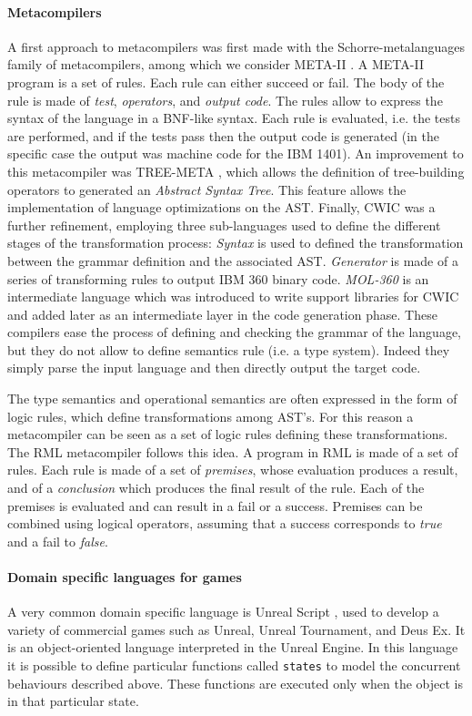 \paragraph{Metacompilers}
A first approach to metacompilers was first made with the
Schorre-metalanguages family of metacompilers, among which we consider
META-II \cite{META2}. A META-II program is a set of rules. Each rule
can either succeed or fail. The body of the rule is made of
\textit{test}, \textit{operators}, and \textit{output code}. The rules
allow to express the syntax of the language in a BNF-like syntax. Each
rule is evaluated, i.e. the tests are performed, and if the tests pass
then the output code is generated (in the specific case the output was
machine code for the IBM 1401). An improvement to this metacompiler
was TREE-META \cite{META3}, which allows the definition of
tree-building operators to generated an \textit{Abstract Syntax Tree}.
This feature allows the implementation of language optimizations on
the AST. Finally, CWIC \cite{CWIC} was a further refinement, employing
three sub-languages used to define the different stages of the
transformation process: \textit{Syntax} is used to defined the
transformation between the grammar definition and the associated AST.
\textit{Generator} is made of a series of transforming rules to output
IBM 360 binary code. \textit{MOL-360} is an intermediate language
which was introduced to write support libraries for CWIC and added
later as an intermediate layer in the code generation phase. These
compilers ease the process of defining and checking the grammar of the
language, but they do not allow to define semantics rule (i.e. a type
system). Indeed they simply parse the input language and then directly
output the target code.

The type semantics and operational semantics are often expressed in
the form of logic rules, which define transformations among AST's. For
this reason a metacompiler can be seen as a set of logic rules
defining these transformations. The RML metacompiler \cite{RML1, RML2,
MODELICA} follows this idea. A program in RML is made of a set of
rules. Each rule is made of a set of \textit{premises}, whose
evaluation produces a result, and of a \textit{conclusion} which
produces the final result of the rule. Each of the premises is
evaluated and can result in a fail or a success. Premises can be
combined using logical operators, assuming that a success corresponds
to \textit{true} and a fail to \textit{false}.

\paragraph{Domain specific languages for games}
A very common domain specific language is Unreal Script
\cite{UNREAL_ENGINE}, used to develop a variety of commercial games
such as Unreal, Unreal Tournament, and Deus Ex. It is an
object-oriented language interpreted in the Unreal Engine. In this
language it is possible to define particular functions called
\texttt{states} to model the concurrent behaviours described above.
These functions are executed only when the object is in that
particular state.

